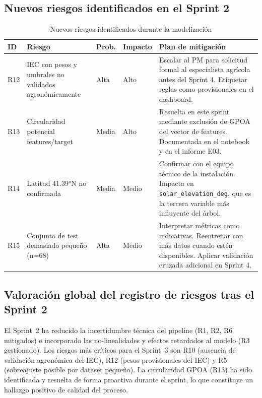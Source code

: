 \documentclass[12pt,a4paper]{article}
\begin{document}
\subsection{Nuevos riesgos identificados en el Sprint 2}

\begin{table}[H]
\centering
\caption{Nuevos riesgos identificados durante la modelización}
\label{tab:riesgos_nuevos}
\renewcommand{\arraystretch}{1.4}
\begin{tabularx}{\textwidth}{p{0.8cm} p{3.5cm} p{1.2cm} p{1.2cm} X}
\toprule
\textbf{ID} & \textbf{Riesgo} & \textbf{Prob.} & \textbf{Impacto} & \textbf{Plan de mitigación} \\
\midrule
R12 & IEC con pesos y umbrales no validados agronómicamente
  & Alta & Alto
  & Escalar al PM para solicitud formal al especialista agrícola antes del Sprint 4. Etiquetar reglas como provisionales en el dashboard. \\
R13 & Circularidad potencial features/target
  & Media & Alto
  & Resuelta en este sprint mediante exclusión de GPOA del vector de features. Documentada en el notebook y en el informe E03. \\
R14 & Latitud 41.39°N no confirmada
  & Media & Medio
  & Confirmar con el equipo técnico de la instalación. Impacta en \texttt{solar\_elevation\_deg}, que es la tercera variable más influyente del árbol. \\
R15 & Conjunto de test demasiado pequeño (n=68)
  & Alta & Medio
  & Interpretar métricas como indicativas. Reentrenar con más datos cuando estén disponibles. Aplicar validación cruzada adicional en Sprint 4. \\
\bottomrule
\end{tabularx}
\end{table}

\subsection{Valoración global del registro de riesgos tras el Sprint 2}

El Sprint~2 ha reducido la incertidumbre técnica del pipeline (R1, R2, R6 mitigados) e incorporado las no-linealidades y efectos retardados al modelo (R3 gestionado). Los riesgos más críticos para el Sprint~3 son R10 (ausencia de validación agronómica del IEC), R12 (pesos provisionales del IEC) y R5 (sobreajuste posible por dataset pequeño). La circularidad GPOA (R13) ha sido identificada y resuelta de forma proactiva durante el sprint, lo que constituye un hallazgo positivo de calidad del proceso.
\end{document}
